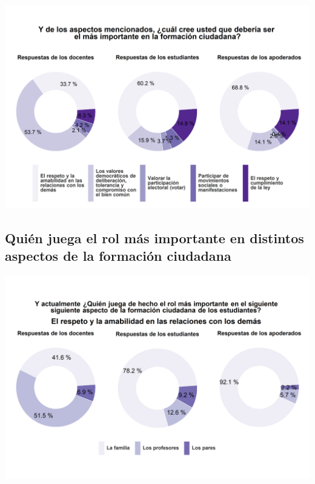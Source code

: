 \documentclass[
  14pt,
]{book}
\begin{document}
\begin{center}\includegraphics[width=52.49in]{images/graph_for_ciud6} \end{center}

\hypertarget{quiuxe9n-juega-el-rol-muxe1s-importante-en-distintos-aspectos-de-la-formaciuxf3n-ciudadana}{%
\subsection{Quién juega el rol más importante en distintos aspectos de la formación ciudadana}\label{quiuxe9n-juega-el-rol-muxe1s-importante-en-distintos-aspectos-de-la-formaciuxf3n-ciudadana}}

\begin{center}\includegraphics[width=52.49in]{images/graph_for_ciud7} \end{center}
\end{document}
